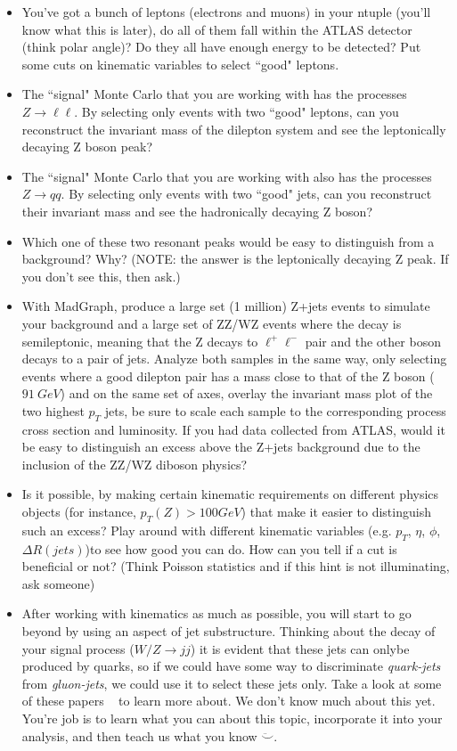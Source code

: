 \documentclass[12pt]{article}
\begin{document}
\begin{itemize}
  \item You've got a bunch of leptons (electrons and muons) in your ntuple (you'll know what this is later), do all of them fall within the ATLAS detector ~\cite{detector} (think polar angle)?  Do they all have enough energy to be detected?  Put some cuts on kinematic variables to select ``good" leptons.
  \item The ``signal" Monte Carlo that you are working with has the processes $Z\rightarrow \ell \ell$.  By selecting only events with two ``good" leptons, can you reconstruct the invariant mass of the dilepton system and see the leptonically decaying Z boson peak? 
  \item The ``signal" Monte Carlo that you are working with also has the processes $Z\rightarrow qq$.  By selecting only events with two ``good" jets, can you reconstruct their invariant mass and see the hadronically decaying Z boson? 
  \item Which one of these two resonant peaks would be easy to distinguish from a background?  Why? (NOTE: the answer is the leptonically decaying Z peak.  If you don't see this, then ask.)
 \item With MadGraph, produce a large set (1 million) Z+jets events to simulate your background and a large set of ZZ/WZ events where the decay is semileptonic, meaning that the Z decays to $\ell^{+} \ell^{-}$ pair and the other boson decays to a pair of jets.  Analyze both samples in the same way, only selecting events where a good dilepton pair has a mass close to that of the Z boson ($91 \ GeV$) and on the same set of axes, overlay the invariant mass plot of the two highest $p_{T}$ jets, be sure to scale each sample to the corresponding process cross section and luminosity.  If you had data collected from ATLAS, would it be easy to distinguish an excess above the Z+jets background due to the inclusion of the ZZ/WZ diboson physics? 
 \item Is it possible, by making certain kinematic requirements on different physics objects (for instance, $p_{T}(Z) > 100 GeV$) that make it easier to distinguish such an excess?  Play around with different kinematic variables (e.g. $p_{T}$, $\eta$, $\phi$, $\Delta R(jets)$)to see how good you can do.  How can you tell if a cut is beneficial or not? (Think Poisson statistics and if this hint is not illuminating, ask someone)   
 \item After working with kinematics as much as possible, you will start to go beyond by using an aspect of jet substructure.  Thinking about the decay of your signal process ($W/Z\rightarrow j j$) it is evident that these jets can onlybe produced by quarks, so if we could have some way to discriminate \textit{quark-jets} from \textit{gluon-jets}, we could use it to select these jets only.  Take a look at some of these papers ~\cite{jetss_4} to learn more about.  We don't know much about this yet.  You're job is to learn what you can about this topic, incorporate it into your analysis, and then teach us what you know $\ddot\smile$.
\end{itemize}
\end{document}
